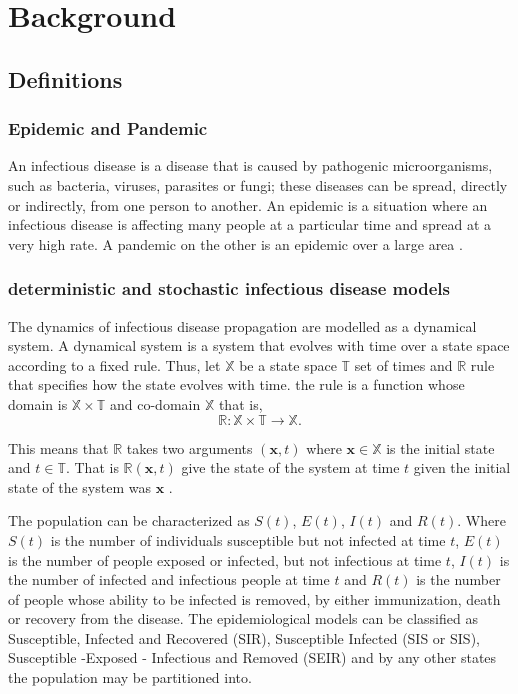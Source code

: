 \chapter{Background}

\section{Definitions}
\subsection{Epidemic and Pandemic }
An infectious disease is a disease that is caused by pathogenic microorganisms, such as bacteria, viruses, parasites or fungi; these diseases can be spread, directly or indirectly, from one person to another. An epidemic is a situation where an infectious disease is affecting many people at a particular time and spread at a very high rate. A pandemic on the other is an epidemic over a large area \citep{morens2009pandemic}.

\subsection{deterministic and stochastic infectious disease models}
The dynamics of infectious disease propagation are modelled as a dynamical system. A dynamical system is a system that evolves with time over a state space according to a fixed rule. Thus, let $\mathbb{X}$ be a state space $\mathbb{T}$ set of times and $\mathbb{R}$ rule that specifies how the state evolves with time. the rule is a function  whose domain is $\mathbb{X} \times  \mathbb{T}$ and co-domain $\mathbb{X}$ that is,
\begin{equation*}
\mathbb{R}: \mathbb{X}  \times \mathbb{T} \longrightarrow \mathbb{X}.
\end{equation*}

This means that $\mathbb{R}$ takes two arguments $( \textbf{x},t)$ where $\textbf{x} \in \mathbb{X}$ is the initial state and $t \in \mathbb{T}$. That is $\mathbb{R} ( \textbf{x},t)$ give the state of the system at time  $t$ given the initial state of the system was $\textbf{x}$ \citep{DQ}.

The population can be characterized as $S (t) $, $E (t) $, $I (t) $ and $R (t) $. Where $S (t) $ is the number of individuals susceptible but not infected at time $t$, $E (t) $ is the number of people exposed or infected, but not infectious at time $t$, $I (t) $ is the number of infected and infectious people at time $t$ and $R (t) $ is the number of people whose ability to be infected is removed, by either immunization, death or recovery from the disease. The epidemiological models can be classified as Susceptible, Infected and Recovered (SIR), Susceptible Infected (SIS or SIS), Susceptible -Exposed - Infectious and Removed (SEIR) and by any other states the population may be partitioned into.
  
